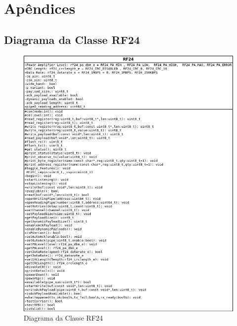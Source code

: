 \chapter{Apêndices}

\section{Diagrama da Classe RF24}
  \begin{figure}[!htb]
    \centering
    \includegraphics[width=\linewidth]{../../Imagens/RF24_class.png}
    \caption{Diagrama da Classe RF24} %
    \label{RF24_ClassDiag}
  \end{figure}

